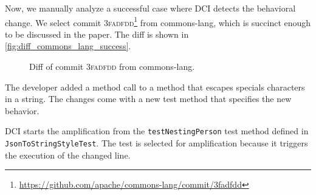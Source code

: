 Now, we manually analyze a successful case where DCI detects the behavioral change.
We select commit \textsc{3fadfdd}\footnote{\url{https://github.com/apache/commons-lang/commit/3fadfdd}} from commons-lang, which is succinct enough to be discussed in the paper.
The diff is shown in \autoref{fig:diff_commons_lang_success}.

\begin{figure}[h]
\centering
{}
\caption{Diff of commit \textsc{3fadfdd} from commons-lang.}
\label{fig:diff_commons_lang_success}
\end{figure}

The developer added a method call to a method that escapes specials characters in a string. 
The changes come with a new test method that specifies the new behavior. 

DCI starts the amplification from the \texttt{testNestingPerson} test method defined in \texttt{JsonToStringStyleTest}. The test is selected for amplification because it triggers the execution of the changed line.

